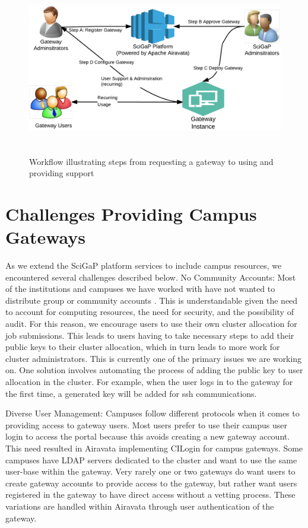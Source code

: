 \documentclass[sigconf]{acmart}
\begin{document}
\begin{figure}
\includegraphics[height=3in, width=7in]{figures/gateway-approvals.pdf}
\caption{Workflow illustrating steps from requesting a gateway to using and providing support}
\end{figure}

\section{Challenges Providing Campus Gateways}
As we extend the SciGaP platform services to include campus resources, we encountered several challenges described below.
No Community Accounts: Most of the institutions and campuses we have worked with have not wanted to distribute group or community accounts \cite{welch2007aaaa}. This is understandable given the need to account for computing resources, the need for security, and the possibility of audit. For this reason, we encourage users to use their own cluster allocation for job submissions. This leads to users having to take necessary steps to add their public keys to their cluster allocation, which in turn leads to more work for cluster administrators.  This is currently one of the primary issues we are working on. One solution involves automating the process of adding the public key to user allocation in the cluster.  For example,  when the user logs in to the gateway for the first time, a generated key will be added for ssh communications.

Diverse User Management: Campuses follow different protocols when it comes to providing access to gateway users. Most users prefer to use their campus user login to access the portal because this avoids creating a new gateway account. This need resulted in Airavata implementing CILogin for campus gateways. Some campuses have LDAP servers dedicated to the cluster and want to use the same user-base within the gateway. Very rarely one or two gateways do want users to create gateway accounts to  provide access to the gateway, but rather want users registered in the gateway to have direct access without a vetting process. These variations are handled within Airavata through user authentication of the gateway. 
\end{document}
